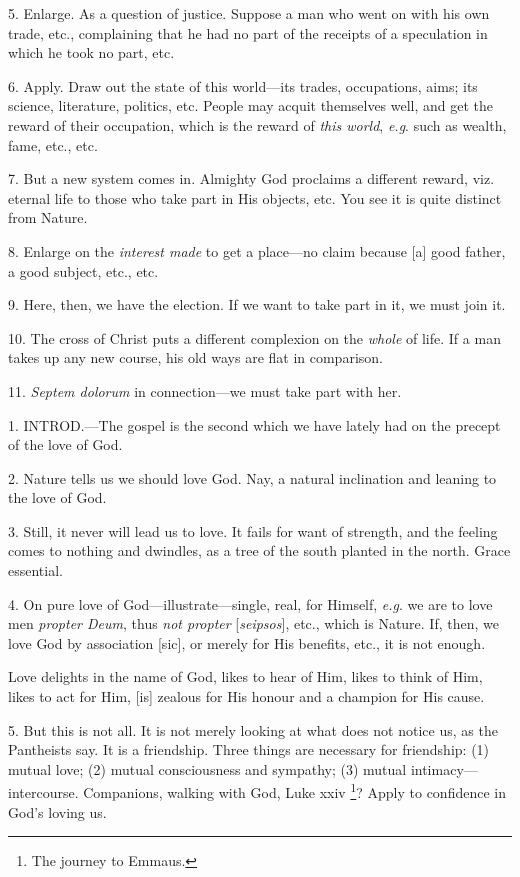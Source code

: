 5. Enlarge. As a question of justice. Suppose a
man who went on with his own trade, etc., complaining that he had no
part of the receipts of a speculation in which he took no part, etc.

6. Apply. Draw out the state of this world—its
trades, occupations, aims; its science, literature, politics, etc.
People may acquit themselves well, and get the reward of their
occupation, which is the reward of \emph{this world}, \emph{e.g}. such
as wealth, fame, etc., etc.

7. But a new system comes in. Almighty God
proclaims a different reward, viz. eternal life to those who take part
in His objects, etc. You see it is quite distinct from Nature.

8. Enlarge on the \emph{interest made} to get a
place—no claim because [a] good father, a good subject, etc., etc.

9. Here, then, we have the election. If we want
to take part in it, we must join it.

10. The cross of Christ puts a different
complexion on the \emph{whole} of life. If a man takes up any new
course, his old ways are flat in comparison.

11. \emph{Septem dolorum} in connection—we must
take part with her.


1. INTROD.—The
gospel is the second which we have lately had on the precept of the
love of God.

2. Nature tells us we should love God. Nay, a
natural inclination and leaning to the love of God.

3. Still, it never will lead us to love. It fails
for want of strength, and the feeling comes to nothing and dwindles,
as a tree of the south planted in the north. Grace essential.

4. On pure love of God—illustrate—single,
real, for Himself, \emph{e.g}. we are to love men \emph{propter Deum},
thus \emph{not propter} [\emph{seipsos}], etc., which is Nature. If,
then, we love God by association [sic], or merely for His benefits,
etc., it is not enough.

Love delights in the name of God, likes to hear
of Him, likes to think of Him, likes to act for Him, [is] zealous for
His honour and a champion for His cause.

5. But this is not all. It is not merely looking
at what does not notice us, as the Pantheists say. It is a friendship.
Three things are necessary for friendship: (1) mutual love; (2) mutual
consciousness and sympathy; (3) mutual intimacy—intercourse.
Companions, walking with God, Luke xxiv \footnote{The journey to Emmaus.}? Apply to confidence in God's loving us.

